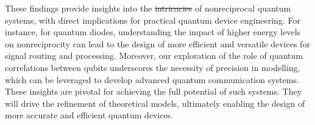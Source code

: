 \documentclass[lettersize,journal]{IEEEtran}
\providecommand{\DIFaddtex}[1]{{\protect\color{blue}\uwave{#1}}} %
\providecommand{\DIFdeltex}[1]{{\protect\color{red}\sout{#1}}}                      %
\providecommand{\DIFaddbegin}{} %
\providecommand{\DIFaddend}{} %
\providecommand{\DIFdelbegin}{} %
\providecommand{\DIFdelend}{} %
\providecommand{\DIFadd}[1]{\texorpdfstring{\DIFaddtex{#1}}{#1}} %
\providecommand{\DIFdel}[1]{\texorpdfstring{\DIFdeltex{#1}}{}} %
\newcommand{\DIFscaledelfig}{0.5}
\newlength{\DIFdelgraphicswidth} %
\newlength{\DIFdelgraphicsheight} %
\newcommand{\DIFaddincludegraphics}[2][]{{\color{blue}\fbox{\DIFOincludegraphics[#1]{#2}}}} %
\newcommand{\DIFdelincludegraphics}[2][]{%
\sbox{\DIFdelgraphicsbox}{\DIFOincludegraphics[#1]{#2}}%
\settoboxwidth{\DIFdelgraphicswidth}{\DIFdelgraphicsbox} %
\settoboxtotalheight{\DIFdelgraphicsheight}{\DIFdelgraphicsbox} %
\scalebox{\DIFscaledelfig}{%
\parbox[b]{\DIFdelgraphicswidth}{\usebox{\DIFdelgraphicsbox}\\[-\baselineskip] \rule{\DIFdelgraphicswidth}{0em}}\llap{\resizebox{\DIFdelgraphicswidth}{\DIFdelgraphicsheight}{%
\setlength{\unitlength}{\DIFdelgraphicswidth}%
\begin{picture}(1,1)%
\thicklines\linethickness{2pt} %
{\color[rgb]{1,0,0}\put(0,0){\framebox(1,1){}}}%
{\color[rgb]{1,0,0}\put(0,0){\line( 1,1){1}}}%
{\color[rgb]{1,0,0}\put(0,1){\line(1,-1){1}}}%
\end{picture}%
}\hspace*{3pt}}} %
} %
\DeclareRobustCommand{\DIFaddbegin}{\DIFOaddbegin \let\includegraphics\DIFaddincludegraphics} %
\DeclareRobustCommand{\DIFaddend}{\DIFOaddend \let\includegraphics\DIFOincludegraphics} %
\DeclareRobustCommand{\DIFdelbegin}{\DIFOdelbegin \let\includegraphics\DIFdelincludegraphics} %
\DeclareRobustCommand{\DIFdelend}{\DIFOaddend \let\includegraphics\DIFOincludegraphics} %
\begin{document}
These findings provide insights into the \DIFdelbegin \DIFdel{intricacies }\DIFdelend \DIFaddbegin \DIFadd{complexities }\DIFaddend of nonreciprocal quantum systems, with direct implications for practical quantum device engineering. 
For instance, for quantum diodes, understanding the impact of higher energy levels on nonreciprocity can lead to the design of more efficient and versatile devices for signal routing and processing. 
Moreover, our exploration of the role of quantum correlations between qubits underscores the necessity of precision in modelling, which can be leveraged to develop advanced quantum communication systems. 
These insights are pivotal for achieving the full potential of such systems. They will drive the refinement of theoretical models, ultimately enabling the design of more accurate and efficient quantum devices. 





\end{document}
